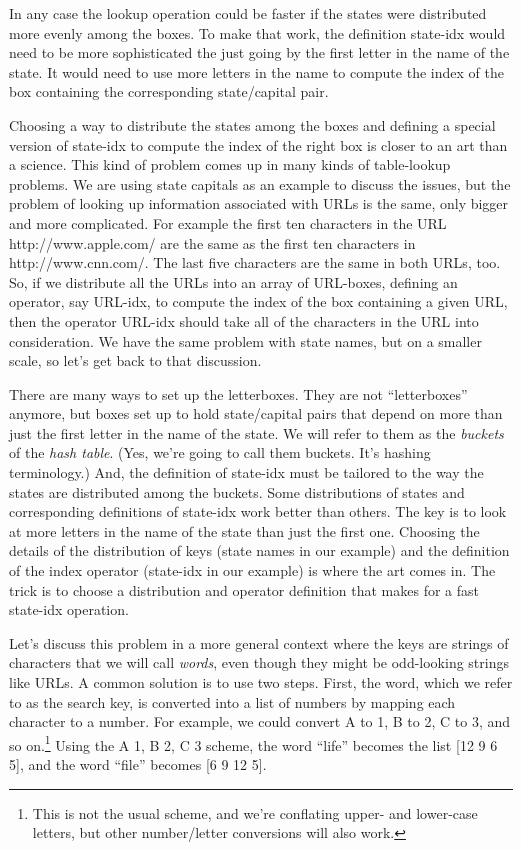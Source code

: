 In any case the \textsf{lookup} operation could be faster
if the states were distributed more evenly among the boxes.
To make that work, the definition
\textsf{state-idx} would need to be more sophisticated
the just going by the first letter in the name of the state.
It would need to use more letters in the name
to compute the index of the box containing the corresponding
state/capital pair.

Choosing a way to distribute the states among the boxes
and defining a special version of \textsf{state-idx}
to compute the index of the right box is closer to an
art than a science. This kind of problem comes up in
many kinds of table-lookup problems. We are using
state capitals as an example to discuss the issues,
but the problem of looking up information associated
with URLs is the same, only bigger and more complicated.
For example the first ten characters in the URL
http://www.apple.com/ are the same as the first ten
characters in http://www.cnn.com/. The last five
characters are the same in both URLs, too.
So, if we distribute all the URLs into an array of URL-boxes,
defining an operator, say \textsf{URL-idx}, to compute the
index of the box containing a given URL,
then the operator \textsf{URL-idx} should take
all of the characters in the URL into consideration.
We have the same problem with state names, but on a
smaller scale, so let's get back to that discussion.

There are many ways to set up the letterboxes.
They are not ``letterboxes'' anymore, but boxes set up to hold
state/capital pairs that depend
on more than just the first letter in the name of the state.
We will refer to them as the
\emph{buckets}
of the \emph{hash table}.
(Yes, we're going to call them buckets. It's hashing terminology.)
And, the definition of \textsf{state-idx} must be
tailored to the way the states are distributed among the buckets.
Some distributions of states and corresponding definitions
of \textsf{state-idx} work better than others.
The key is to look at more letters in the name of the state
than just the first one.
Choosing the details of the distribution of keys
(state names in our example) and the definition of the index operator
(\textsf{state-idx} in our example) is where the art comes in.
The trick is to choose a distribution and operator
definition that makes for a fast \textsf{state-idx} operation.

Let's discuss this problem in a more general context
where the keys are strings of characters that we will
call \emph{words}, even though they might be odd-looking
strings like URLs.
A common solution is to use two steps. First, the word,
which we refer to as the search key, is converted
into a list of numbers by mapping each character to a number. For
example, we could convert A to 1, B to 2, C to 3, 
and so on.\footnote{This is not the usual scheme, 
and we're conflating upper- and
lower-case letters, but other number/letter conversions  will also work.}
Using the A 1, B 2, C 3 scheme, the word ``life'' becomes the list
\textsf{[12 9 6 5]},
and the word ``file'' becomes \textsf{[6 9 12 5]}.


